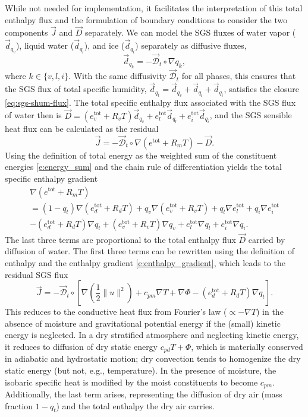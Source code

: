 \documentclass{article}
\begin{document}
While not needed for implementation, it facilitates the interpretation of this total enthalpy flux and the formulation of boundary conditions to consider the two components $\vec{J}$ and $\vec{D}$ separately. We can model the SGS fluxes of water vapor ($\vec{d}_{q_v}$), liquid water ($\vec{d}_{q_l}$), and ice ($\vec{d}_{q_i}$) separately as diffusive fluxes, 
\begin{equation}\label{e:water_diffusion}
    \vec{d}_{q_k} = - \vec{\mathcal{D}}_t \circ \nabla q_k,
\end{equation}
where $k \in \{v, l, i\}$. With the same diffusivity $\vec{\mathcal{D}}_t$ for all phases, this ensures that the SGS flux of total specific humidity, $\vec{d}_{q_t} = \vec{d}_{q_v} + \vec{d}_{q_l} + \vec{d}_{q_i}$, satisfies the closure \eqref{eq:sgs-shum-flux}. The total specific enthalpy flux associated with the SGS flux of water then is $\vec{D} = (e_v^{\mathrm{tot}} + R_v T) \vec{d}_{q_v} + e_l^{\mathrm{tot}} \vec{d}_{q_l} +  e_i^{\mathrm{tot}} \vec{d}_{q_i}$,
and the SGS sensible heat flux can be calculated as the residual
\[
    \vec{J} = - \vec{\mathcal{D}}_t \circ \nabla (e^{\mathrm{tot}} + R_m T) - \vec{D}.
\]
Using the definition of total energy as the weighted sum of the constituent energies \eqref{e:energy_sum} and the chain rule of differentiation yields the total specific enthalpy gradient
\begin{multline*}
\nabla (e^{\mathrm{tot}} + R_m T) \\
= (1-q_t)\nabla (e_d^{\mathrm{tot}} + R_d T) + q_v \nabla (e_v^{\mathrm{tot}} + R_v T) + q_l \nabla e_l^{\mathrm{tot}} + q_i \nabla e_i^{\mathrm{tot}} \\
- (e_d^{\mathrm{tot}} + R_d T) \nabla q_t + (e_v^{\mathrm{tot}} + R_v T) \nabla q_v + e_l^{\mathrm{tot}}\nabla q_l + e_i^{\mathrm{tot}} \nabla q_i.
\end{multline*}
The last three terms are proportional to the total enthalpy flux $\vec{D}$ carried by diffusion of water. The first three terms can be rewritten using the definition of enthalpy and the enthalpy gradient \eqref{e:enthalpy_gradient}, which leads to the residual SGS flux
\begin{equation}\label{e:sgs_heat_flux}
\vec{J} = - \vec{\mathcal{D}}_t \circ \left[ \nabla \left( \frac{1}{2} \| u \|^2 \right) + c_{pm} \nabla T + \nabla \Phi - (e_d^{\mathrm{tot}} + R_d T) \nabla q_t \right].
\end{equation}
This reduces to the conductive heat flux from Fourier's law ($\propto -\nabla T$) in the absence of moisture and gravitational potential energy if the (small) kinetic energy is neglected. In a dry stratified atmosphere and neglecting kinetic energy, it reduces to diffusion of dry static energy $c_{pd} T + \Phi$, which is materially conserved in adiabatic and hydrostatic motion; dry convection tends to homogenize the dry static energy (but not, e.g., temperature). In the presence of moisture, the isobaric specific heat is modified by the moist constituents to become $c_{pm}$. Additionally, the last term arises, representing the diffusion of dry air (mass fraction $1-q_t$) and the total enthalpy the dry air carries.
\end{document}
